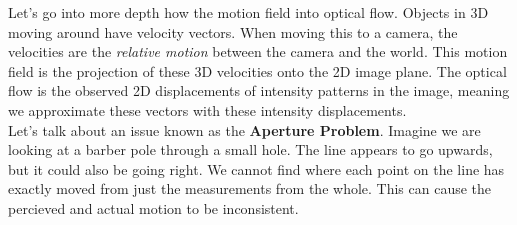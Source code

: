 \documentclass{article}
\begin{document}
Let's go into more depth how the motion field into optical flow. Objects in 3D moving around have velocity vectors. When moving this to a camera, the velocities are the \textit{relative motion} between the camera and the world. This motion field is the projection of these 3D velocities onto the 2D image plane. The optical flow is the observed 2D displacements of intensity patterns in the image, meaning we approximate these vectors with these intensity displacements. 
\\
Let's talk about an issue known as the \textbf{Aperture Problem}. Imagine we are looking at a barber pole through a small hole. The line appears to go upwards, but it could also be going right. We cannot find where each point on the line has exactly moved from just the measurements from the whole. This can cause the percieved and actual motion to be inconsistent.
\\
\end{document}
